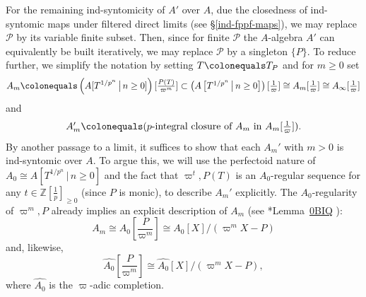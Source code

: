 \documentclass[11pt, reqno]{amsart}
\newcommand{\revise}[1]{{\color{Bittersweet}  
 #1}}					%
\renewcommand{\revise}[1]{#1}
\newcommand{\bZ}{\mathbb{Z}}
\newcommand{\cP}{\mathcal{P}}
\newcommand{\ce}{\colonequals}
\providecommand{\p}[1]{\left(#1\right)}
\newcommand{\wh}{\widehat}
\providecommand{\f}[2]{\frac{#1}{#2}}
\newcommand{\x}{\text}
\newcommand{\rv}{\revise}
\newcommand{\tst}{\textstyle}
\newcommand{\be}{\begin{equation}}
\newcommand{\ee}{\end{equation}}
\numberwithin{equation}{numberingbase}
\theoremstyle{thms}
\theoremstyle{claims}
\theoremstyle{defs}
\theoremstyle{thms}
\theoremstyle{defs}
\theoremstyle{subsection-tweak}
\theoremstyle{subsection-tweak}
\begin{document}
For the remaining ind-syntomicity of $A'$ over $A$, due the closedness of ind-syntomic maps under filtered direct limits (see \S\ref{ind-fppf-maps}), we may replace $\cP$ by its variable finite subset. Then, since for finite $\cP$ the $A$-algebra $A'$ can equivalently be built iteratively, we may replace $\cP$ by a singleton $ \{ P \}$. To reduce further, we simplify the notation by setting $T \ce T_P$ and for $m \ge 0$ set
\[
A_{m} \ce \p{A[T^{1/p^n} \, \big\vert\, n \ge 0]}\tst [\f{P(T)}{\varpi^m}] \subset \p{A\left[T^{1/p^n} \, \big\vert\, n \ge 0 \right]}[\tst\f{1}{\varpi}] \cong A_{m}[\f{1}{\varpi}] \cong A_{\infty}[\f{1}{\varpi}]
\]
and
\[
\tst A'_m \ce (\x{$p$-integral closure of $A_{m}$ in $A_{m}[\tst \f{1}{\varpi}]$}).
\]
By another passage to a limit, it suffices to show that each $A_m'$ with $m > 0$ is ind-syntomic over $A$. To argue this, we will use the perfectoid nature of $A_0 \cong A\left[T^{1/p^n} \, \big\vert\, n \ge 0 \right]$ and the fact that $\varpi^t, P(T)$ is an $A_0$-regular sequence for any $t \in \bZ[\f{1}{p}]_{\ge 0}$ (since $P$ is monic),  to describe $A_m'$ explicitly. The $A_0$-regularity of $\varpi^m, P$ already implies an explicit description of $A_m$ (see \cite{SP}*{Lemma~\href{https://stacks.math.columbia.edu/tag/0BIQ}{0BIQ}}%
):
\be \label{exp-blowup}
\tst A_m \cong A_0[\f{P}{\varpi^m}] \cong A_0[X]/(\varpi^mX - P)
\ee 
and, likewise,
\[
\tst\wh{A_0}[\f{P}{\varpi^m}] \cong \wh{A_0}[X]/(\varpi^m X - P),
\]
where $\wh{A_0}$ is the $\varpi$-adic completion. 
\end{document}
